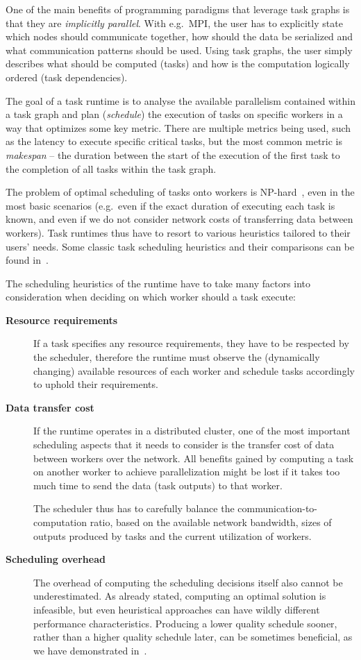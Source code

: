 One of the main benefits of programming paradigms that leverage task graphs is that they are
\emph{implicitly parallel}. With e.g.\ MPI, the user has to explicitly state which nodes should
communicate together, how should the data be serialized and what communication patterns should be
used. Using task graphs, the user simply describes what should be computed (tasks) and how is the
computation logically ordered (task dependencies).

The goal of a task runtime is to analyse the available parallelism contained within a task graph
and plan (\emph{schedule}) the execution of tasks on specific workers in a way that
optimizes some key metric. There are multiple metrics being used, such as the latency to execute
specific critical tasks, but the most common metric is \emph{makespan} -- the duration
between the start of the execution of the first task to the completion of all tasks within the task
graph.

The problem of optimal scheduling of tasks onto workers is NP-hard~\cite{Ullman1975}, even in
the most basic scenarios (e.g.\ even if the exact duration of executing each task is known, and
even if we do not consider network costs of transferring data between workers). Task runtimes thus
have to resort to various heuristics tailored to their users' needs. Some classic task scheduling
heuristics and their comparisons can be found in~\cite{hlfet1974,kwok1998benchmarking,hagras2003static,wang2018list,estee}.

The scheduling heuristics of the runtime have to take many factors into consideration when deciding
on which worker should a task execute:

\begin{description}
	\item[\textbf{Resource requirements}] If a task specifies any resource requirements, they have to be respected by the scheduler,
		therefore the runtime must observe the (dynamically changing) available resources of each worker
		and schedule tasks accordingly to uphold their requirements.
	\item[\textbf{Data transfer cost}] If the runtime operates in a distributed cluster, one of the most important scheduling aspects that
		it needs to consider is the transfer cost of data between workers over the network. All benefits
		gained by computing a task on another worker to achieve parallelization might be lost if it takes
		too much time to send the data (task outputs) to that worker.

		The scheduler thus has to carefully balance the communication-to-computation ratio, based on the
		available network bandwidth, sizes of outputs produced by tasks and the current utilization of
		workers.
	\item[\textbf{Scheduling overhead}] The overhead of computing the scheduling decisions itself also cannot be underestimated. As already
		stated, computing an optimal solution is infeasible, but even heuristical approaches can have
		wildly different performance characteristics. Producing a lower quality schedule sooner, rather
		than a higher quality schedule later, can be sometimes beneficial, as we have demonstrated
		in~\cite{rsds}.
\end{description}
